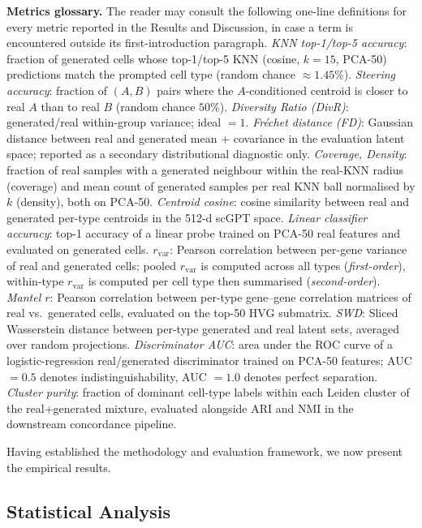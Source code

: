 \documentclass[11pt,a4paper]{article}
\begin{document}
\textbf{Metrics glossary.} The reader may consult the following one-line definitions for every metric reported in the Results and Discussion, in case a term is encountered outside its first-introduction paragraph. \emph{KNN top-1/top-5 accuracy}: fraction of generated cells whose top-1/top-5 KNN (cosine, $k{=}15$, PCA-50) predictions match the prompted cell type (random chance $\approx 1.45\%$). \emph{Steering accuracy}: fraction of $(A,B)$ pairs where the $A$-conditioned centroid is closer to real $A$ than to real $B$ (random chance $50\%$). \emph{Diversity Ratio (DivR)}: generated/real within-group variance; ideal $= 1$. \emph{Fr\'echet distance (FD)}: Gaussian distance between real and generated mean + covariance in the evaluation latent space; reported as a secondary distributional diagnostic only. \emph{Coverage, Density}: fraction of real samples with a generated neighbour within the real-KNN radius (coverage) and mean count of generated samples per real KNN ball normalised by $k$ (density), both on PCA-50. \emph{Centroid cosine}: cosine similarity between real and generated per-type centroids in the 512-d scGPT space. \emph{Linear classifier accuracy}: top-1 accuracy of a linear probe trained on PCA-50 real features and evaluated on generated cells. \emph{$r_\text{var}$}: Pearson correlation between per-gene variance of real and generated cells; pooled $r_\text{var}$ is computed across all types (\textit{first-order}), within-type $r_\text{var}$ is computed per cell type then summarised (\textit{second-order}). \emph{Mantel $r$}: Pearson correlation between per-type gene--gene correlation matrices of real vs.\ generated cells, evaluated on the top-50 HVG submatrix. \emph{SWD}: Sliced Wasserstein distance between per-type generated and real latent sets, averaged over random projections. \emph{Discriminator AUC}: area under the ROC curve of a logistic-regression real/generated discriminator trained on PCA-50 features; AUC $= 0.5$ denotes indistinguishability, AUC $= 1.0$ denotes perfect separation. \emph{Cluster purity}: fraction of dominant cell-type labels within each Leiden cluster of the real+generated mixture, evaluated alongside ARI and NMI in the downstream concordance pipeline.

Having established the methodology and evaluation framework, we now present the empirical results.

\subsection{Statistical Analysis}\label{sec:stats}
\end{document}

